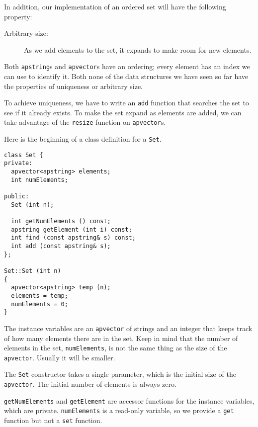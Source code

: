 In addition, our implementation of an ordered set will have the
following property:

\begin{description}

\item[Arbitrary size:] As we add elements to the set, it expands
to make room for new elements.

\end{description}

Both {\tt apstring}s and {\tt apvector}s have an ordering; every
element has an index we can use to identify it.  Both none of
the data structures we have seen so far have the properties of
uniqueness or arbitrary size.


To achieve uniqueness, we have to write an {\tt add} function
that searches the set to see if it already exists.  To make the
set expand as elements are added, we can take advantage of the
{\tt resize} function on {\tt apvector}s.

Here is the beginning of a class definition for a {\tt Set}.

\begin{verbatim}
class Set {
private:
  apvector<apstring> elements;
  int numElements;

public:
  Set (int n);

  int getNumElements () const;
  apstring getElement (int i) const;
  int find (const apstring& s) const;
  int add (const apstring& s);
};

Set::Set (int n)
{
  apvector<apstring> temp (n);
  elements = temp;
  numElements = 0;
}
\end{verbatim}
%
The instance variables are an {\tt apvector} of strings and an
integer that keeps track of how many elements there are in the
set.  Keep in mind that the number of elements in the
set, {\tt numElements}, is not the same thing as the size
of the {\tt apvector}.  Usually it will be smaller.


The {\tt Set} constructor takes a single parameter, which is
the initial size of the {\tt apvector}.  The initial number
of elements is always zero.

{\tt getNumElements} and {\tt getElement} are accessor functions
for the instance variables, which are private.  {\tt numElements}
is a read-only variable, so we provide a {\tt get} function
but not a {\tt set} function.

